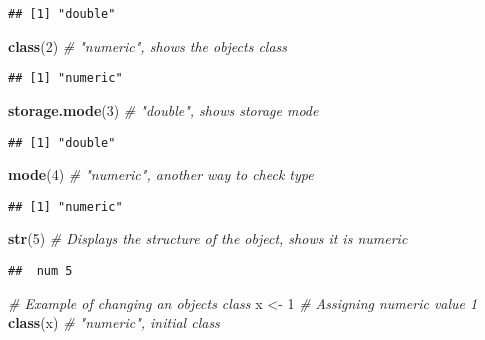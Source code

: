 \documentclass[
]{article}
\newenvironment{Shaded}{\begin{snugshade}}{\end{snugshade}}
\newcommand{\CommentTok}[1]{\textcolor[rgb]{0.56,0.35,0.01}{\textit{#1}}}
\newcommand{\DecValTok}[1]{\textcolor[rgb]{0.00,0.00,0.81}{#1}}
\newcommand{\FunctionTok}[1]{\textcolor[rgb]{0.13,0.29,0.53}{\textbf{#1}}}
\newcommand{\NormalTok}[1]{#1}
\newcommand{\OtherTok}[1]{\textcolor[rgb]{0.56,0.35,0.01}{#1}}
\begin{document}
\begin{verbatim}
## [1] "double"
\end{verbatim}

\begin{Shaded}
\begin{Highlighting}[]
\FunctionTok{class}\NormalTok{(}\DecValTok{2}\NormalTok{)                }\CommentTok{\# "numeric", shows the object\textquotesingle{}s class}
\end{Highlighting}
\end{Shaded}

\begin{verbatim}
## [1] "numeric"
\end{verbatim}

\begin{Shaded}
\begin{Highlighting}[]
\FunctionTok{storage.mode}\NormalTok{(}\DecValTok{3}\NormalTok{)        }\CommentTok{\# "double", shows storage mode}
\end{Highlighting}
\end{Shaded}

\begin{verbatim}
## [1] "double"
\end{verbatim}

\begin{Shaded}
\begin{Highlighting}[]
\FunctionTok{mode}\NormalTok{(}\DecValTok{4}\NormalTok{)                 }\CommentTok{\# "numeric", another way to check type}
\end{Highlighting}
\end{Shaded}

\begin{verbatim}
## [1] "numeric"
\end{verbatim}

\begin{Shaded}
\begin{Highlighting}[]
\FunctionTok{str}\NormalTok{(}\DecValTok{5}\NormalTok{)                  }\CommentTok{\# Displays the structure of the object, shows it is numeric}
\end{Highlighting}
\end{Shaded}

\begin{verbatim}
##  num 5
\end{verbatim}

\begin{Shaded}
\begin{Highlighting}[]
\CommentTok{\# Example of changing an object\textquotesingle{}s class}
\NormalTok{x }\OtherTok{\textless{}{-}} \DecValTok{1}                  \CommentTok{\# Assigning numeric value 1}
\FunctionTok{class}\NormalTok{(x)                }\CommentTok{\# "numeric", initial class}
\end{Highlighting}
\end{Shaded}
\end{document}
